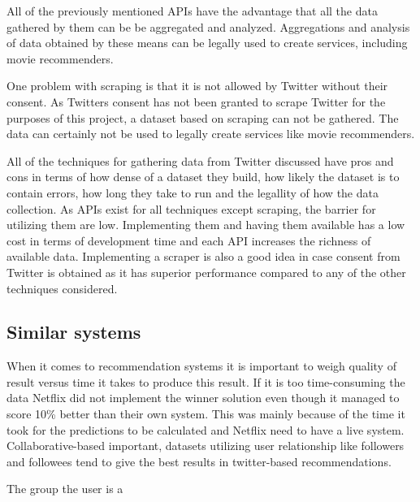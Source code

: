 All of the previously mentioned APIs have the advantage that all the data gathered by them can be be aggregated and analyzed. Aggregations and analysis of data obtained by these means can be legally used to create services, including movie recommenders.

One problem with scraping is that it is not allowed by Twitter without their consent. As Twitters consent has not been granted to scrape Twitter for the purposes of this project, a dataset based on scraping can not be gathered. The data can certainly not be used to legally create services like movie recommenders.

All of the techniques for gathering data from Twitter discussed have pros and cons in terms of how dense of a dataset they build, how likely the dataset is to contain errors, how long they take to run and the legallity of how the data collection. As APIs exist for all techniques except scraping, the barrier for utilizing them are low. Implementing them and having them available has a low cost in terms of development time and each API increases the richness of available data. Implementing a scraper is also a good idea in case consent from Twitter is obtained as it has superior performance compared to any of the other techniques considered.

\subsection{Similar systems}
When it comes to recommendation systems it is important to weigh quality of result versus time it takes to produce this result. If it is too time-consuming the data
Netflix did not implement the winner solution even though it managed to score 10\% better than their own system. This was mainly because of the time it took for the predictions to be calculated and Netflix need to have a live system.
Collaborative-based important, datasets utilizing user relationship like followers and followees tend to give the best results in twitter-based recommendations.

The group the user is a
